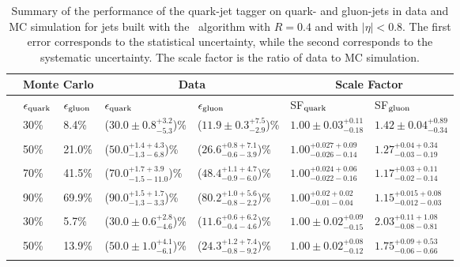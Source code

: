\begin{table}[htbp]
\caption{
Summary of the performance of the quark-jet tagger on quark- and gluon-jets in data and \Pythia MC simulation for jets built with the \antikt~algorithm with $R=0.4$ and with $|\eta|<0.8$. 
The first error corresponds to the statistical uncertainty, while the second corresponds to the systematic uncertainty.
The scale factor is the ratio of data to MC simulation. 
\label{tab:perfSummary}}
\begin{center}
\begin{tabular}{|c|l|l|l|l|l|l|}
\hline
& \multicolumn{2}{|c|}{Monte Carlo} & \multicolumn{2}{|c|}{Data} & \multicolumn{2}{|c|}{Scale Factor} \\ 
\hline
& $\epsilon_{\rm quark}$ & $\epsilon_{\rm gluon}$ & $\epsilon_{\rm quark}$ & $\epsilon_{\rm gluon}$ & SF$_{\rm quark}$ & SF$_{\rm gluon}$ \\
\hline\noalign{\smallskip}
\multirow{4}{*}{\begin{sideways}$\pt=60$--$80 \GeV$\end{sideways}} 
& 30\% &  8.4\% &  ($30.0\pm0.8^{+3.2}_{-5.3}$)\%    &  ($11.9\pm0.3^{+7.5}_{-2.9}$)\%    &  $1.00\pm0.03^{+0.11}_{-0.18}$ & $1.42\pm0.04^{+0.89}_{-0.34}$ \\&&&&&&\\
& 50\% & 21.0\% &  ($50.0^{+1.4+4.3}_{-1.3-6.8}$)\%  &  ($26.6^{+0.8+7.1}_{-0.6-3.9}$)\%  &  $1.00^{+0.027+0.09}_{-0.026-0.14}$ & $1.27^{+0.04+0.34}_{-0.03-0.19}$ \\&&&&&&\\
& 70\% & 41.5\% &  ($70.0^{+1.7+3.9}_{-1.5-11.0}$)\%  &  ($48.4^{+1.1+4.7}_{-0.9-6.0}$)\%  &  $1.00^{+0.024+0.06}_{-0.022-0.16}$ & $1.17^{+0.03+0.11}_{-0.02-0.14}$ \\&&&&&&\\
& 90\% & 69.9\% &  ($90.0^{+1.5+1.7}_{-1.3-3.3}$)\%  &  ($80.2^{+1.0+5.6}_{-0.8-2.2}$)\%   &  $1.00^{+0.02+0.02}_{-0.01-0.04}$ & $1.15^{+0.015+0.08}_{-0.012-0.03}$ \\&&&&&&\\
\hline\noalign{\smallskip}
\multirow{4}{*}{\begin{sideways}\centering$\pt=110$--$160 \GeV$\end{sideways}} 
& 30\% &  5.7\% &  ($30.0\pm0.6^{+2.8}_{-4.6}$)\%  & ($11.6^{+0.6+6.2}_{-0.4-4.6}$)\%   & $1.00\pm0.02^{+0.09}_{-0.15}$ & $2.03^{+0.11+1.08}_{-0.08-0.81}$ \\ &&&&&&\\
& 50\% & 13.9\% &  ($50.0\pm1.0^{+4.1}_{-6.1}$)\%  & ($24.3^{+1.2+7.4}_{-0.8-9.2}$)\%   & $1.00\pm0.02^{+0.08}_{-0.12}$ & $1.75^{+0.09+0.53}_{-0.06-0.66}$ \\ &&&&&&\\

\end{tabular}
\end{center}
\end{table}
